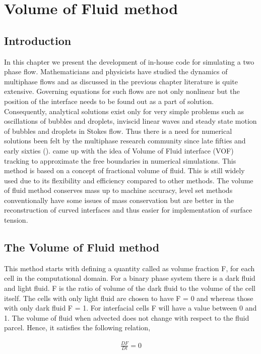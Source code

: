 \chapter{Volume of Fluid method}

\section{Introduction}
In this chapter we present the development of in-house code for simulating a two phase flow.
Mathematicians and physicists have studied the dynamics of multiphase flows and as discussed in the previous chapter
literature is quite extensive. Governing equations for such flows are not only nonlinear but the 
position of the interface needs to be found out as a part of solution. Consequently, analytical solutions exist only for very simple problems such as oscillations of bubbles and droplets,
inviscid linear waves and steady state motion of bubbles and droplets in Stokes flow. Thus there is a need for numerical solutions been felt by the multiphase
research community since late fifties and early sixties (\cite{Tryggvason2011}). 
\cite{Hirt1981} came up with the idea of Volume of Fluid interface {(VOF)} tracking to approximate
the free boundaries in numerical simulations. This method is based on a concept of fractional volume of fluid. This is still widely used due to its flexibility and efficiency
compared to other methods. 
The volume of fluid method conserves mass up to machine accuracy, level set methods conventionally have some issues of mass conservation but
are better in the reconstruction of curved interfaces and thus easier for implementation of surface tension.

\section{The Volume of Fluid method}
This method starts with defining a quantity called as volume fraction F, for each cell in the computational domain. For a binary phase system there is a dark fluid and light fluid.
F is the ratio of volume of the dark fluid to the volume of the cell itself. The cells with only light fluid are chosen to have F = 0 and whereas those with only dark fluid F = 1. For interfacial cells
F will have a value between 0 and 1. The volume of fluid when advected does not change with respect to the fluid parcel. Hence, it satisfies the following relation,

\begin{eqnarray}
\frac{D F}{D t} = 0 
\end{eqnarray}

